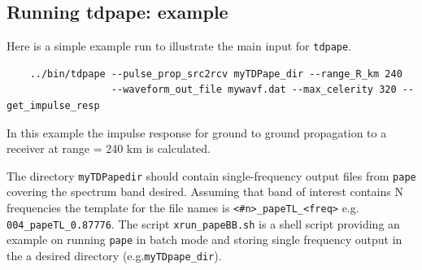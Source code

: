 \subsection{Running tdpape: example}

Here is a simple example run to illustrate the main input for \verb+tdpape+.
\begin{verbatim} 
    ../bin/tdpape --pulse_prop_src2rcv myTDPape_dir --range_R_km 240 
                  --waveform_out_file mywavf.dat --max_celerity 320 --get_impulse_resp
\end{verbatim}

In this example the impulse response for ground to ground propagation to a receiver at range = 240 km is calculated. 

The directory \verb"myTDPapedir" should contain single-frequency output files from \verb"pape" covering the spectrum band desired. Assuming that band of interest contains N frequencies the template for the file names is  \verb"<#n>_papeTL_<freq>"  e.g. \verb"004_papeTL_0.87776".  The script \verb"xrun_papeBB.sh" is a shell script providing an example on running \verb"pape" in batch mode and storing single frequency output in the a desired directory (e.g.\verb"myTDpape_dir").

